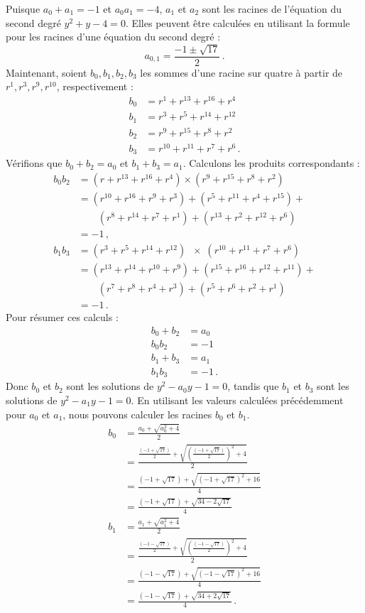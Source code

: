 Puisque $a_0+a_1=-1$ et $a_0 a_1=-4$, $a_1$ et $a_2$ sont les racines de l'équation du second degré $y^2+y-4=0$. Elles peuvent être calculées en utilisant la formule pour les racines d'une équation du second degré :
\[
a_{0,1} = \frac{-1\pm\sqrt{17}}{2}\,.
\]
Maintenant, soient $b_0,b_1,b_2,b_3$ les sommes d'une racine sur quatre à partir de $r^1,r^3,r^9,r^{10}$, respectivement :
\begin{align*}
b_0&= r^1+ r^{13} + r^{16} + r^4\\
b_1&= r^3+ r^{5} + r^{14} + r^{12}\\
b_2&= r^9+ r^{15} + r^{8} + r^2\\
b_3&= r^{10}+ r^{11} + r^{7} + r^6\,.
\end{align*}
Vérifions que $b_0+b_2=a_0$ et $b_1+b_3=a_1$. Calculons les produits correspondants :
\begin{align*}
b_0b_2&=(r + r^{13} + r^{16} +r^4)\times (r^9 + r^{15} + r^{8} +r^{2})\\
&=(r^{10}+r^{16}+r^9+r^3)+(r^{5}+r^{11}+r^4+r^{15})+\\
&\quad \quad (r^{8}+r^{14}+r^7+r^1)+(r^{13}+r^{2}+r^{12}+r^6)\\
&=-1\,,\\
b_1b_3&=(r^3 + r^{5} + r^{14} +r^{12})\;\;\times\;(r^{10} + r^{11} + r^{7} +r^{6})\\
&=(r^{13}+r^{14}+r^{10}+r^9)+(r^{15}+r^{16}+r^{12}+r^{11})+\\
&\quad \quad (r^{7}+r^{8}+r^4+r^3) +(r^{5}+r^{6}+r^{2}+r^1)\\
&=-1\,.
\end{align*}
Pour résumer ces calculs :
\begin{align*}
b_0+b_2&=a_0\\
b_0b_2&=-1\\
b_1+b_3&=a_1\\
b_1b_3&=-1\,.
\end{align*}
Donc $b_0$ et $b_2$ sont les solutions de $y^2-a_0y-1= 0$, tandis que $b_1$ et $b_3$ sont les solutions de $y^2-a_1y-1 =0$. En utilisant les valeurs calculées précédemment pour $a_0$ et $a_1$, nous pouvons calculer les racines $b_0$ et $b_1$.
\begin{align*}
b_0&=\frac{a_0+\sqrt{a_0^2+4}}{2}\\
&=\frac{
     \displaystyle\frac{(-1+\sqrt{17})}{2} + 
     \sqrt{\left(\displaystyle\frac{(-1+\sqrt{17})}{2}\right)^2+4}
   }{2}\\
&=\frac{
     (-1+\sqrt{17}) + 
     \sqrt{\left(-1+\sqrt{17}\right)^2+16}
   }{4}\\
&=\frac{
     (-1+\sqrt{17}) + 
     \sqrt{34-2\sqrt{17}}
   }{4}\\
b_1&=\frac{a_1+\sqrt{a_1^2+4}}{2}\\
&=\frac{
     \displaystyle\frac{(-1-\sqrt{17})}{2} + 
     \sqrt{\left(\displaystyle\frac{(-1-\sqrt{17})}{2}\right)^2+4}
   }{2}\\
&=\frac{
     (-1-\sqrt{17}) + 
     \sqrt{\left(-1-\sqrt{17}\right)^2+16}
   }{4}\\
&=\frac{
     (-1-\sqrt{17}) + 
     \sqrt{34+2\sqrt{17}}
   }{4}\,.
\end{align*}

